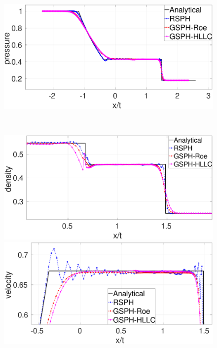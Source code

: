 \begin{figure}
\begin{minipage}{.495\textwidth}
    \end{minipage}%
    \begin{minipage}{.495 \textwidth}
        \centering
        \includegraphics[width=0.99 \textwidth,height=0.6\textwidth]{./Chapter-4/Figures/Sod/RCM-Sod-GSPH-compare-p}
    \end{minipage}%
    \\
    \begin{minipage}{.495\textwidth}
        \centering
        \includegraphics[width=0.99 \textwidth,height=0.6\textwidth]{./Chapter-4/Figures/Sod/RCM-Sod-GSPH-compare-rho-zoom}
    \end{minipage}%
    \begin{minipage}{.495 \textwidth}
        \centering
        \includegraphics[width=0.99 \textwidth,height=0.6\textwidth]{./Chapter-4/Figures/Sod/RCM-Sod-GSPH-compare-v-zoom}

\end{minipage}
\end{figure}
